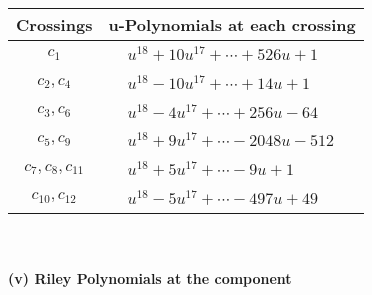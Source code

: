 \documentclass[1p]{elsarticle_modified}
\theoremstyle{definition}
\begin{document}
\begin{tabular}{m{50pt}|m{274pt}}
Crossings & \hspace{64pt}u-Polynomials at each crossing \\
\hline $$\begin{aligned}c_{1}\end{aligned}$$&$\begin{aligned}
&u^{18}+10 u^{17}+\cdots+526 u+1
\end{aligned}$\\
\hline $$\begin{aligned}c_{2},c_{4}\end{aligned}$$&$\begin{aligned}
&u^{18}-10 u^{17}+\cdots+14 u+1
\end{aligned}$\\
\hline $$\begin{aligned}c_{3},c_{6}\end{aligned}$$&$\begin{aligned}
&u^{18}-4 u^{17}+\cdots+256 u-64
\end{aligned}$\\
\hline $$\begin{aligned}c_{5},c_{9}\end{aligned}$$&$\begin{aligned}
&u^{18}+9 u^{17}+\cdots-2048 u-512
\end{aligned}$\\
\hline $$\begin{aligned}c_{7},c_{8},c_{11}\end{aligned}$$&$\begin{aligned}
&u^{18}+5 u^{17}+\cdots-9 u+1
\end{aligned}$\\
\hline $$\begin{aligned}c_{10},c_{12}\end{aligned}$$&$\begin{aligned}
&u^{18}-5 u^{17}+\cdots-497 u+49
\end{aligned}$\\
\hline
\end{tabular}\\~\\
\newpage\renewcommand{\arraystretch}{1}
\flushleft \textbf{(v) Riley Polynomials at the component}\newline \\
\end{document}
